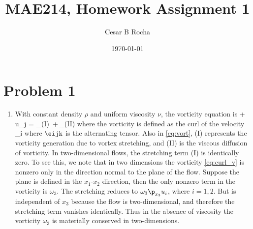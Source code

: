 \documentclass[11pt]{article}
\title{MAE214, Homework Assignment 1}
\author{Cesar B Rocha}
\date{\today}
\begin{document}


\maketitle

\section*{Problem 1}

\begin{enumerate}[label=(\alph*)]

    \item With constant density $\rho$ and uniform viscosity $\nu$, the vorticity equation is
        \beq
            \label{eq:vort}
               + u_j  = _{(I)} \,+\,_{(II)}\com
        \eeq
        where the vorticity is defined as the curl of the velocity
        \beq
            \label{eq:curl_v}
            \omega_i  \eijk {}\com
        \eeq
        where $\eijk$ is the alternating tensor. Also in \eqref{eq:vort}, (I) represents the vorticity generation due to vortex stretching, and (II) is the viscous diffusion of vorticity. In two-dimensional flows, the stretching term (I) is identically zero.  To see this, we note that in two dimensions the vorticity \eqref{eq:curl_v} is nonzero only in the direction normal to the plane of the flow. Suppose the plane is defined in the $x_1$-$x_2$ direction, then the only nonzero term in the vorticity is $\omega_3$. The stretching reduces to $\omega_3 \p_{x_3}u_i$, where $i=1,2$. But is independent of $x_3$ because the flow is two-dimensional, and therefore the stretching term vanishes identically. Thus in the absence of  viscosity the vorticity $\omega_3$ is materially conserved in two-dimensions. 


\end{enumerate}
\end{document}
